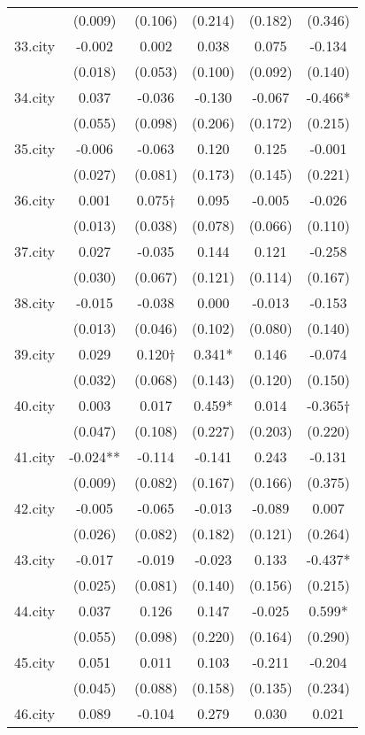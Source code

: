\documentclass[]{article}
\begin{document}
\begin{tabular}{lccccc}
 & (0.009) & (0.106) & (0.214) & (0.182) & (0.346) \\
33.city & -0.002 & 0.002 & 0.038 & 0.075 & -0.134 \\
 & (0.018) & (0.053) & (0.100) & (0.092) & (0.140) \\
34.city & 0.037 & -0.036 & -0.130 & -0.067 & -0.466* \\
 & (0.055) & (0.098) & (0.206) & (0.172) & (0.215) \\
35.city & -0.006 & -0.063 & 0.120 & 0.125 & -0.001 \\
 & (0.027) & (0.081) & (0.173) & (0.145) & (0.221) \\
36.city & 0.001 & 0.075† & 0.095 & -0.005 & -0.026 \\
 & (0.013) & (0.038) & (0.078) & (0.066) & (0.110) \\
37.city & 0.027 & -0.035 & 0.144 & 0.121 & -0.258 \\
 & (0.030) & (0.067) & (0.121) & (0.114) & (0.167) \\
38.city & -0.015 & -0.038 & 0.000 & -0.013 & -0.153 \\
 & (0.013) & (0.046) & (0.102) & (0.080) & (0.140) \\
39.city & 0.029 & 0.120† & 0.341* & 0.146 & -0.074 \\
 & (0.032) & (0.068) & (0.143) & (0.120) & (0.150) \\
40.city & 0.003 & 0.017 & 0.459* & 0.014 & -0.365† \\
 & (0.047) & (0.108) & (0.227) & (0.203) & (0.220) \\
41.city & -0.024** & -0.114 & -0.141 & 0.243 & -0.131 \\
 & (0.009) & (0.082) & (0.167) & (0.166) & (0.375) \\
42.city & -0.005 & -0.065 & -0.013 & -0.089 & 0.007 \\
 & (0.026) & (0.082) & (0.182) & (0.121) & (0.264) \\
43.city & -0.017 & -0.019 & -0.023 & 0.133 & -0.437* \\
 & (0.025) & (0.081) & (0.140) & (0.156) & (0.215) \\
44.city & 0.037 & 0.126 & 0.147 & -0.025 & 0.599* \\
 & (0.055) & (0.098) & (0.220) & (0.164) & (0.290) \\
45.city & 0.051 & 0.011 & 0.103 & -0.211 & -0.204 \\
 & (0.045) & (0.088) & (0.158) & (0.135) & (0.234) \\
46.city & 0.089 & -0.104 & 0.279 & 0.030 & 0.021 \\

\end{tabular}
\end{document}
